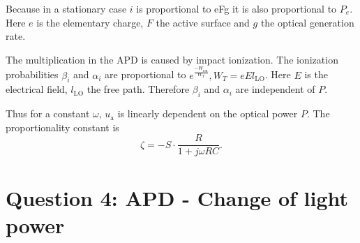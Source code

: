 Because in a stationary case $i$ is proportional to eFg it is also proportional to $P_e$. Here $e$ is the elementary charge, $F$ the active surface and $g$ the optical generation rate.
 
The multiplication in the APD is caused by impact ionization. The ionization probabilities $\beta_i$ and $\alpha_i$ are proportional to $e^{\frac{-W_{\mathrm{ion}}}{W_T}},  W_T=eEl_\mathrm{LO}$. Here $E$ is the electrical field, $l_\mathrm{LO}$ the free path. Therefore $\beta_i$ and $\alpha_i$ are independent of $P$.


Thus for a constant $\omega$, $u_{\mathrm{a}}$ is linearly dependent on the optical power $P$. The proportionality constant is 
\begin{equation}
\zeta = -S\cdot \frac{R}{1+ j\omega RC}.
\label{eq:}
\end{equation}
 
\section{Question 4: APD - Change of light power}


